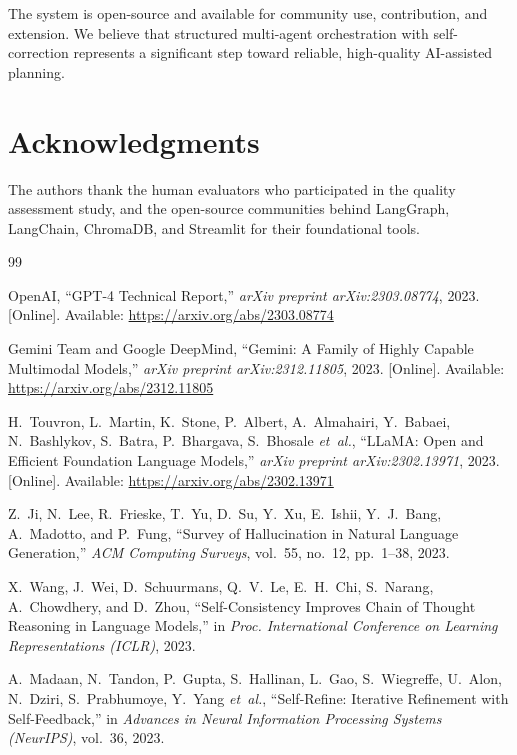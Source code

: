 \documentclass[journal]{IEEEtran}
\begin{document}
The system is open-source and available for community use, contribution, and extension. We believe that structured multi-agent orchestration with self-correction represents a significant step toward reliable, high-quality AI-assisted planning.

\section*{Acknowledgments}
The authors thank the human evaluators who participated in the quality assessment study, and the open-source communities behind LangGraph, LangChain, ChromaDB, and Streamlit for their foundational tools.

\begin{thebibliography}{99}

OpenAI, ``{GPT-4} Technical Report,'' \textit{arXiv preprint arXiv:2303.08774}, 2023. [Online]. Available: \url{https://arxiv.org/abs/2303.08774}

Gemini Team and Google DeepMind, ``Gemini: A Family of Highly Capable Multimodal Models,'' \textit{arXiv preprint arXiv:2312.11805}, 2023. [Online]. Available: \url{https://arxiv.org/abs/2312.11805}

H.~Touvron, L.~Martin, K.~Stone, P.~Albert, A.~Almahairi, Y.~Babaei, N.~Bashlykov, S.~Batra, P.~Bhargava, S.~Bhosale \textit{et~al.}, ``{LLaMA}: Open and Efficient Foundation Language Models,'' \textit{arXiv preprint arXiv:2302.13971}, 2023. [Online]. Available: \url{https://arxiv.org/abs/2302.13971}

Z.~Ji, N.~Lee, R.~Frieske, T.~Yu, D.~Su, Y.~Xu, E.~Ishii, Y.~J.~Bang, A.~Madotto, and P.~Fung, ``Survey of Hallucination in Natural Language Generation,'' \textit{ACM Computing Surveys}, vol.~55, no.~12, pp.~1--38, 2023.

X.~Wang, J.~Wei, D.~Schuurmans, Q.~V.~Le, E.~H.~Chi, S.~Narang, A.~Chowdhery, and D.~Zhou, ``Self-Consistency Improves Chain of Thought Reasoning in Language Models,'' in \textit{Proc. International Conference on Learning Representations (ICLR)}, 2023.

A.~Madaan, N.~Tandon, P.~Gupta, S.~Hallinan, L.~Gao, S.~Wiegreffe, U.~Alon, N.~Dziri, S.~Prabhumoye, Y.~Yang \textit{et~al.}, ``Self-Refine: Iterative Refinement with Self-Feedback,'' in \textit{Advances in Neural Information Processing Systems (NeurIPS)}, vol.~36, 2023.


\end{thebibliography}
\end{document}
